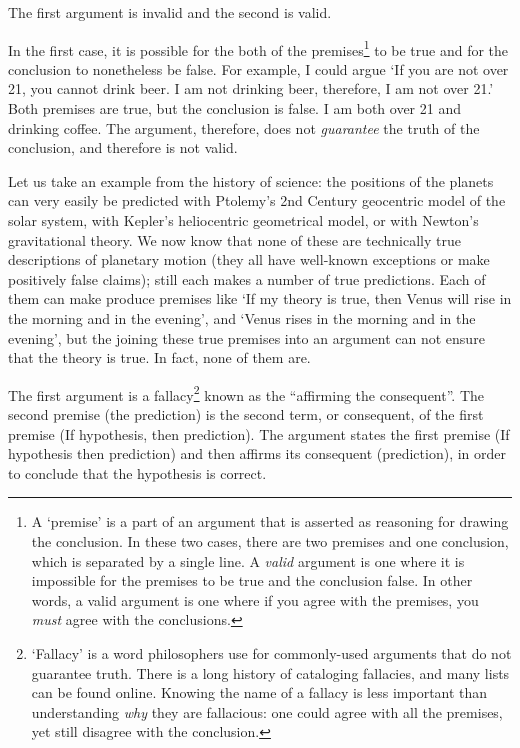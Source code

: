 \begin{refsection}
The first argument is invalid and the second is valid. 

In the first case, it is possible for the both of the premises\footnote{A `premise' is a part of an argument that is asserted as reasoning for drawing the conclusion. In these two cases, there are two premises and one conclusion, which is separated by a single line. A \emph{valid} argument is one where it is impossible for the premises to be true and the conclusion false. In other words, a valid argument is one where if you agree with the premises, you \emph{must} agree with the conclusions.} to be true and for the conclusion to nonetheless be false. For example, I could argue `If you are not over 21, you cannot drink beer. I am not drinking beer, therefore, I am not over 21.' Both premises are true, but the conclusion is false. I am both over 21 and drinking coffee. The argument, therefore, does not \emph{guarantee} the truth of the conclusion, and therefore is not valid.

Let us take an example from the history of science: the positions of the planets can very easily be predicted with Ptolemy's 2nd Century geocentric model of the solar system, with Kepler's heliocentric geometrical model, or with Newton's gravitational theory. We now know that none of these are technically true descriptions of planetary motion (they all have well-known exceptions or make positively false claims); still each makes a number of true predictions. Each of them can make produce premises like `If my theory is true, then Venus will rise in the morning and in the evening', and `Venus rises in the morning and in the evening', but the joining these true premises into an argument can not ensure that the theory is true. In fact, none of them are.

The first argument is a fallacy\footnote{`Fallacy' is a word philosophers use for commonly-used arguments that do not guarantee truth. There is a long history of cataloging fallacies, and many lists can be found online. Knowing the name of a fallacy is less important than understanding \emph{why} they are fallacious: one could agree with all the premises, yet still disagree with the conclusion.} known as the ``affirming the consequent''. The second premise (the prediction) is the second term, or consequent, of the first premise (If hypothesis, then prediction). The argument states the first premise (If hypothesis then prediction) and then affirms its consequent (prediction), in order to conclude that the hypothesis is correct. 


\end{refsection}
